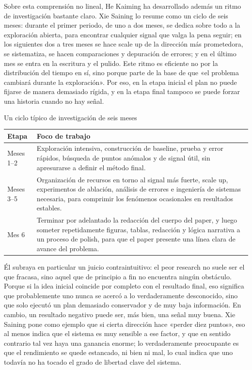 \documentclass[a4paper,12pt]{article}
\begin{document}
Sobre esta comprensión no lineal, He Kaiming ha desarrollado además un ritmo de investigación bastante claro. Xie Saining lo resume como un ciclo de seis meses: durante el primer periodo, de uno a dos meses, se dedica sobre todo a la exploración abierta, para encontrar cualquier signal que valga la pena seguir; en los siguientes dos a tres meses se hace scale up de la dirección más prometedora, se sistematiza, se hacen comparaciones y depuración de errores; y en el último mes se entra en la escritura y el pulido. Este ritmo es eficiente no por la distribución del tiempo en sí, sino porque parte de la base de que «el problema cambiará durante la exploración». Por eso, en la etapa inicial el plan no puede fijarse de manera demasiado rígida, y en la etapa final tampoco se puede forzar una historia cuando no hay señal.

\begin{knowledgebox}{Un ciclo típico de investigación de seis meses}
\begin{tabularx}{\textwidth}{>{\raggedright\arraybackslash}p{} Y}
\toprule
Etapa & Foco de trabajo \\
\midrule
Meses 1--2 & Exploración intensiva, construcción de baseline, prueba y error rápidos, búsqueda de puntos anómalos y de signal útil, sin apresurarse a definir el método final. \\
Meses 3--5 & Organización de recursos en torno al signal más fuerte, scale up, experimentos de ablación, análisis de errores e ingeniería de sistemas necesaria, para comprimir los fenómenos ocasionales en resultados estables. \\
Mes 6 & Terminar por adelantado la redacción del cuerpo del paper, y luego someter repetidamente figuras, tablas, redacción y lógica narrativa a un proceso de polish, para que el paper presente una línea clara de avance del problema. \\
\bottomrule
\end{tabularx}
\end{knowledgebox}

Él subraya en particular un juicio contraintuitivo: el peor research no suele ser el que fracasa, sino aquel que de principio a fin no encuentra ningún obstáculo. Porque si la idea inicial coincide por completo con el resultado final, eso significa que probablemente uno nunca se acercó a lo verdaderamente desconocido, sino que solo ejecutó un plan demasiado conservador y de muy baja información. En cambio, un resultado negativo puede ser, más bien, una señal muy buena. Xie Saining pone como ejemplo que si cierta dirección hace «perder diez puntos», eso al menos indica que el sistema es muy sensible a ese factor, y que en sentido contrario tal vez haya una ganancia enorme; lo verdaderamente preocupante es que el rendimiento se quede estancado, ni bien ni mal, lo cual indica que uno todavía no ha tocado el grado de libertad clave del sistema.
\end{document}
